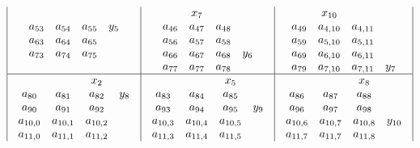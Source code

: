\begin{figure}[ht]
{\[\begin{array}{| c | c | c | c |}
\begin{array}{c c c c}
a_{53} & a_{54} &a_{55} & y_5\\
a_{63} & a_{64} &a_{65} & \\
a_{73} & a_{74} &a_{75} & \\
\end{array}
&
\begin{array}{c c c c}
& x_7\\
a_{46} & a_{47} &a_{48} & \\
a_{56} & a_{57} &a_{58} & \\
a_{66} & a_{67} &a_{68} & y_6 \\
a_{77} & a_{77} &a_{78} & \\
\end{array}
&
\begin{array}{c c c c}
& x_{10}\\
a_{49} & a_{4,10} & a_{4,11} & \\
a_{59} & a_{5,10} & a_{5,11} & \\
a_{69} & a_{6,10} & a_{6,11} & \\
a_{79} & a_{7,10} & a_{7,11} & y_7 \\
\end{array}
\\ \hline
\begin{array}{c c c c}
&&x_2\\
a_{80} &  a_{81} &  a_{82} & y_8\\
a_{90} &  a_{91}   &a_{92} & \\
a_{10,0} &a_{10,1} &a_{10,2} & \\
a_{11,0} &a_{11,1} &a_{11,2} & \\
\end{array}
&
\begin{array}{c c c c}
&&x_5\\
a_{83} &   a_{84} &  a_{85} & \\
a_{93} &   a_{94} &  a_{95} & y_9\\
a_{10,3} & a_{10,4} &a_{10,5} & \\
a_{11,3} & a_{11,4} &a_{11,5} & \\
\end{array}
&
\begin{array}{c c c c}
&&x_8\\
a_{86} &   a_{87} &  a_{88} & \\
a_{96} &   a_{97} &  a_{98} & \\
a_{10,6} & a_{10,7} &a_{10,8} & y_{10} \\
a_{11,7} & a_{11,7} &a_{11,8} & \\
\end{array}

\end{array}\]}
\end{figure}

